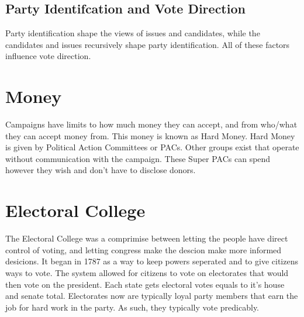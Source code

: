 \documentclass{article}
\begin{document}
\subsection{Party Identifcation and Vote Direction}
\centering
{}
\raggedright

Party identification shape the views of issues and candidates, while the candidates and issues recursively shape party identification. All of these factors influence vote direction.

\section{Money}
Campaigns have limits to how much money they can accept, and from who/what they can accept money from. This money is known as Hard Money. Hard Money is given by Political Action Committees or PACs. Other groups exist that operate without communication with the campaign. These Super PACs can spend however they wish and don't have to disclose donors.

\section{Electoral College}
The Electoral College was a comprimise between letting the people have direct control of voting, and letting congress make the descion make more informed desicions. It began in 1787 as a way to keep powers seperated and to give citizens ways to vote. The system allowed for citizens to vote on electorates that would then vote on the president. Each state gets electoral votes equals to it's house and senate total. Electorates now are typically loyal party members that earn the job for hard work in the party. As such, they typically vote predicably.
\end{document}
